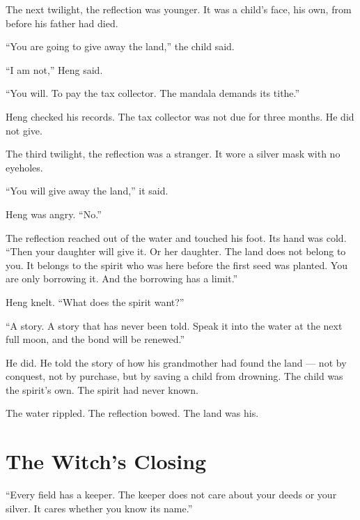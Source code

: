 \documentclass[10pt,twoside]{book}
\begin{document}
The next twilight, the reflection was younger. It was a child's face, his own, from before his father had died.

``You are going to give away the land,'' the child said.

``I am not,'' Heng said.

``You will. To pay the tax collector. The mandala demands its tithe.''

Heng checked his records. The tax collector was not due for three months. He did not give.

The third twilight, the reflection was a stranger. It wore a silver mask with no eyeholes.

``You will give away the land,'' it said.

Heng was angry. ``No.''

The reflection reached out of the water and touched his foot. Its hand was cold. ``Then your daughter will give it. Or her daughter. The land does not belong to you. It belongs to the spirit who was here before the first seed was planted. You are only borrowing it. And the borrowing has a limit.''

Heng knelt. ``What does the spirit want?''

``A story. A story that has never been told. Speak it into the water at the next full moon, and the bond will be renewed.''

He did. He told the story of how his grandmother had found the land --- not by conquest, not by purchase, but by saving a child from drowning. The child was the spirit's own. The spirit had never known.

The water rippled. The reflection bowed. The land was his.

\section*{The Witch's Closing}
``Every field has a keeper. The keeper does not care about your deeds or your silver. It cares whether you know its name.''
\end{document}
